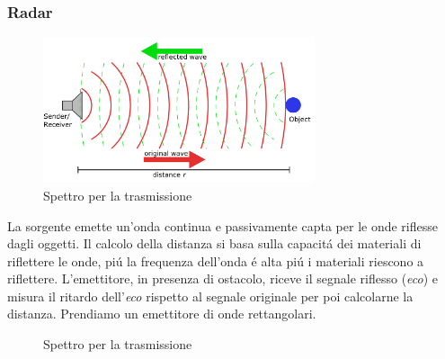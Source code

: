             \subsubsection{Radar}
                \begin{figure}[H]
                    \centering
                    \includegraphics[width=8cm]{media/radar.png}
                    \caption{Spettro per la trasmissione}
                    \label{fig:esempio radar}
                \end{figure}    
                La sorgente emette un'{\color{red}onda} continua e passivamente capta per le {\color{green}onde} riflesse dagli oggetti.
                Il calcolo della distanza si basa sulla capacitá dei materiali di riflettere le onde, piú la frequenza dell'onda é alta 
                piú i materiali riescono a riflettere. L'emettitore, in presenza di ostacolo, riceve il segnale riflesso ({\em eco})
                e misura il ritardo dell'{\em eco} rispetto al segnale originale per poi calcolarne la distanza. Prendiamo un emettitore di onde 
                rettangolari.
                \begin{figure}[H]
                    \centering
                    \caption{Spettro per la trasmissione}
                    \label{fig:radar rettangolare}
                \end{figure}    
